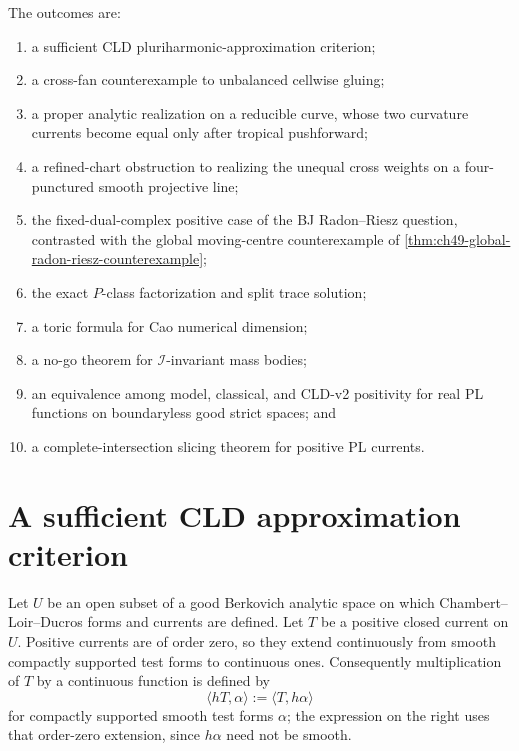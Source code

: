 The outcomes are:
\begin{enumerate}
\item a sufficient CLD pluriharmonic-approximation criterion;
\item a cross-fan counterexample to unbalanced cellwise gluing;
\item a proper analytic realization on a reducible curve, whose two
      curvature currents become equal only after tropical pushforward;
\item a refined-chart obstruction to realizing the unequal cross weights on
      a four-punctured smooth projective line;
\item the fixed-dual-complex positive case of the BJ Radon--Riesz question,
      contrasted with the global moving-centre counterexample of
      \cref{thm:ch49-global-radon-riesz-counterexample};
\item the exact $P$-class factorization and split trace solution;
\item a toric formula for Cao numerical dimension;
\item a no-go theorem for $\mathcal I$-invariant mass bodies;
\item an equivalence among model, classical, and CLD-v2 positivity for
      real PL functions on boundaryless good strict spaces; and
\item a complete-intersection slicing theorem for positive PL currents.
\end{enumerate}

\section{A sufficient CLD approximation criterion}
\label{sec:verified-cld-criterion}

Let $U$ be an open subset of a good Berkovich analytic space on which
Chambert--Loir--Ducros forms and currents are defined. Let $T$ be a
positive closed current on $U$. Positive currents are of order zero,
so they extend continuously from smooth compactly supported test forms
to continuous ones. Consequently multiplication of $T$ by a
continuous function is defined by
\[
                   \langle hT,\alpha\rangle
                       :=\langle T,h\alpha\rangle
\tag{69.1}\label{eq:verified-current-multiplication}
\]
for compactly supported smooth test forms $\alpha$; the expression on
the right uses that order-zero extension, since $h\alpha$ need not be
smooth.

